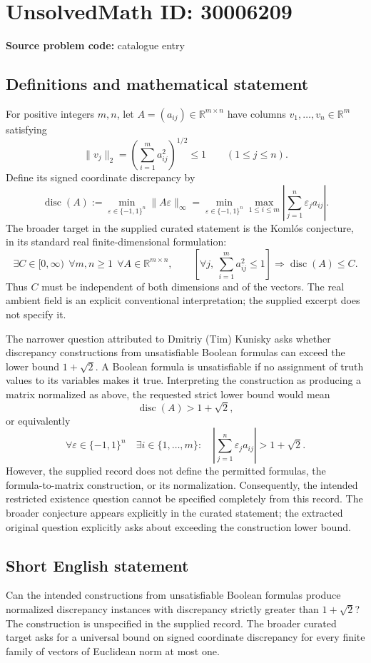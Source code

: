 \documentclass[11pt]{article}
\newcommand{\R}{\mathbb{R}}
\begin{document}
\section*{UnsolvedMath ID: 30006209}
\textbf{Source problem code:} catalogue entry
\subsection{Definitions and mathematical statement}
For positive integers \(m,n\), let \(A=(a_{ij})\in\R^{m\times n}\) have columns \(v_1,\ldots,v_n\in\R^m\) satisfying
\[
\|v_j\|_2=\left(\sum_{i=1}^m a_{ij}^2\right)^{1/2}\leq 1\qquad(1\leq j\leq n).
\]
Define its signed coordinate discrepancy by
\[
\operatorname{disc}(A):=\min_{\varepsilon\in\{-1,1\}^n}\|A\varepsilon\|_\infty
=\min_{\varepsilon\in\{-1,1\}^n}\max_{1\leq i\leq m}\left|\sum_{j=1}^n\varepsilon_j a_{ij}\right|.
\]
The broader target in the supplied curated statement is the Koml\'os conjecture, in its standard real finite-dimensional formulation:
\[
\exists C\in[0,\infty)\ \ \forall m,n\geq1\ \ \forall A\in\R^{m\times n},\qquad
\left[\forall j,\ \sum_{i=1}^m a_{ij}^2\leq1\right]
\Longrightarrow \operatorname{disc}(A)\leq C.
\]
Thus \(C\) must be independent of both dimensions and of the vectors. The real ambient field is an explicit conventional interpretation; the supplied excerpt does not specify it.

The narrower question attributed to Dmitriy (Tim) Kunisky asks whether discrepancy constructions from unsatisfiable Boolean formulas can exceed the lower bound \(1+\sqrt{2}\). A Boolean formula is unsatisfiable if no assignment of truth values to its variables makes it true. Interpreting the construction as producing a matrix normalized as above, the requested strict lower bound would mean
\[
\operatorname{disc}(A)>1+\sqrt{2},
\]
or equivalently
\[
\forall\varepsilon\in\{-1,1\}^n\quad\exists i\in\{1,\ldots,m\}:\quad
\left|\sum_{j=1}^n\varepsilon_j a_{ij}\right|>1+\sqrt{2}.
\]
However, the supplied record does not define the permitted formulas, the formula-to-matrix construction, or its normalization. Consequently, the intended restricted existence question cannot be specified completely from this record. The broader conjecture appears explicitly in the curated statement; the extracted original question explicitly asks about exceeding the construction lower bound.
\subsection{Short English statement}
Can the intended constructions from unsatisfiable Boolean formulas produce normalized discrepancy instances with discrepancy strictly greater than \(1+\sqrt{2}\)? The construction is unspecified in the supplied record. The broader curated target asks for a universal bound on signed coordinate discrepancy for every finite family of vectors of Euclidean norm at most one.
\end{document}
